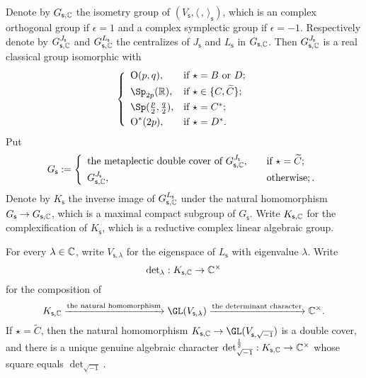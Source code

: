 \documentclass[12pt,a4paper]{amsart}
\newcommand{\oO}{\operatorname{O}}
\newcommand{\R}{\mathbb R}
\newcommand{\la}{\langle}
\newcommand{\ra}{\rangle}
\newcommand{\be}{\begin {equation}}
\newcommand{\ee}{\end {equation}}
\numberwithin{equation}{section}
\theoremstyle{remark}
\begin{document}
Denote by $G_{\mathsf s, \mathbb{C}}$ the isometry group of $ (V_{\mathsf s}, \la\,,\,\ra_{\mathsf s})$, which is an complex orthogonal group if $\epsilon=1$ and a complex symplectic group if $\epsilon=-1$. Respectively denote by  $G_{\mathsf s, \mathbb{C}}^{J_\mathsf s}$  and  $G_{\mathsf s, \mathbb{C}}^{L_\mathsf s}$ the centralizes of $J_\mathsf s$ and $L_\mathsf s$ in  $G_{\mathsf s, \mathbb{C}}$. Then $G_{\mathsf s, \mathbb{C}}^{J_\mathsf s}$ is a real classical group isomorphic with
\[
 \left\{
     \begin{array}{ll}
         \oO(p, q), &\hbox{if $\star=B$ or $D$}; \smallskip\\
            \Sp_{2p}(\R), &\hbox{if $\star\in \{C,\widetilde C\}$}; \smallskip\\
                   \Sp(\frac{p}{2}, \frac{q}{2}), &\hbox{if $\star=C^*$}; \smallskip \\
          \oO^*(2p), &\hbox{if $\star=D^*$}.\\
            \end{array}
   \right.
\]
Put
\[
G_\mathsf s:= \left\{
     \begin{array}{ll}
       \textrm{the metaplectic double cover of $G_{\mathsf s, \C}^{J_\mathsf s}$}, \quad &\hbox{if $\star=\widetilde C$}; \smallskip\\
            G_{\mathsf s, \C}^{J_\mathsf s},  \quad  &\hbox{otherwise};.\\
            \end{array}
   \right.
\]
Denote by $K_{\mathsf s}$ the inverse image of  $G_{\mathsf s, \mathbb{C}}^{L_\mathsf s}$  under the natural homomorphism $G_\mathsf s\rightarrow G_{\mathsf s,\mathbb{C}}$, which is a maximal compact subgroup of $G_{\mathsf s}$. Write $K_{\mathsf s, \mathbb{C}}$ for the complexification of  $K_{\mathsf s}$, which is a reductive complex linear algebraic group.

For every $\lambda\in \mathbb{C}$, write $V_{\mathsf s, \lambda}$ for the eigenspace of $L_{\mathsf s}$ with eigenvalue $\lambda$. Write
\[
{\det}_\lambda : K_{\mathsf s, \mathbb{C}}\rightarrow \mathbb{C}^\times
\]
for the composition of
\be\label{comdet}
   K_{\mathsf s, \C}\xrightarrow{\textrm{the natural homomorphism}} \GL(V_{\mathsf s, \lambda})\xrightarrow{\textrm{the determinant character}}\C^\times.
\ee
If $\star=\widetilde C$, then the natural homomorphism  $ K_{\mathsf s, \C}\rightarrow \GL(V_{\mathsf s, \sqrt{-1}})$ is a double cover, and there is a unique genuine algebraic character
$\det_{\sqrt{-1}}^{\frac{1}{2}}:  K_{\mathsf s, \mathbb{C}}\rightarrow \mathbb{C}^\times $ whose square equals $\det_{\sqrt{-1}}$.
\end{document}
